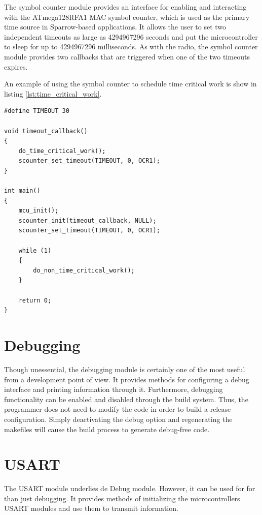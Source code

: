 The symbol counter module provides an interface for enabling and interacting
with the \mbox{ATmega128RFA1} MAC symbol counter, which is used as the primary
time source in Sparrow-based applications. It allows the user to set two
independent timeouts as large as 4294967296 seconds and put the microcontroller
to sleep for up to 4294967296 milliseconds. As with the radio, the symbol
counter module provides two callbacks that are triggered when one of the two
timeouts expires.

An example of using the symbol counter to schedule time critical work is show
in listing \ref{lst:time_critical_work}.

\lstset{
	language=C, numbers=none, caption=Time critical work snippet,
	label=lst:time_critical_work
}
\begin{lstlisting}
#define TIMEOUT	30

void timeout_callback()
{
	do_time_critical_work();
	scounter_set_timeout(TIMEOUT, 0, OCR1);
}

int main()
{
	mcu_init();
	scounter_init(timeout_callback, NULL);
	scounter_set_timeout(TIMEOUT, 0, OCR1);

	while (1)
	{
		do_non_time_critical_work();
	}

	return 0;
}
\end{lstlisting}

\section{Debugging}

Though unessential, the debugging module is certainly one of the most useful
from a development point of view. It provides methods for configuring a debug
interface and printing information through it. Furthermore, debugging
functionality can be enabled and disabled through the build system. Thus, the
programmer does not need to modify the code in order to build a release
configuration. Simply deactivating the debug option and regenerating the
makefiles will cause the build process to generate debug-free code.

\section{USART}

The USART module underlies de Debug module. However, it can be used for for
than just debugging. It provides methods of initializing the microcontrollers
USART modules and use them to transmit information.

